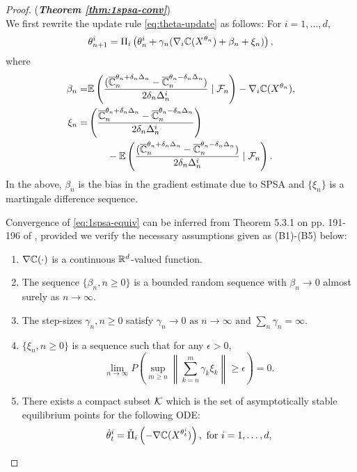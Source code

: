 \begin{proof}(\textbf{\textit{Theorem \ref{thm:1spsa-conv}}})\ \\
We first rewrite the update rule \eqref{eq:theta-update} as follows: For $i=1,\ldots,d$,
\begin{align}
\theta^{i}_{n+1}  =  \Pi_i\left(\theta^{i}_n +  \gamma_n(\nabla_{i} \mathbb{C}(X^{\theta_n}) + \beta_n + \xi_n)\right), 
\label{eq:1spsa-equiv}
\end{align}
where 
\begin{align*}
\beta_n = &\mathbb{E}\left(\dfrac{(\overline {\mathbb{C}}_n^{\theta_n + \delta_n \Delta_n} -\overline {\mathbb{C}}_n^{\theta_n - \delta_n \Delta_n})}{2 \delta_n \Delta_n^{i}} \mid \mathcal{F}_n \right) - \nabla_i \mathbb{C}(X^{\theta_n}),\\
\xi_n = & \left(\dfrac{\overline {\mathbb{C}}_n^{\theta_n + \delta_n \Delta_n} -\overline {\mathbb{C}}_n^{\theta_n - \delta_n \Delta_n}}{2 \delta_n\Delta_n^{i}}\right) \\
&\qquad - \mathbb{E}\left(\dfrac{(\overline {\mathbb{C}}_n^{\theta_n + \delta_n \Delta_n} -\overline {\mathbb{C}}_n^{\theta_n - \delta_n \Delta_n})}{2 \delta_n \Delta_n^{i}}\mid \mathcal{F}_n \right).
\end{align*}
In the above, $\beta_n$ is the bias in the gradient estimate due to SPSA and $\{\xi_n\}$ is a martingale difference sequence.

Convergence of \eqref{eq:1spsa-equiv} can be inferred from Theorem 5.3.1 on pp. 191-196 of \cite{kushner-clark}, provided we verify the necessary assumptions given as (B1)-(B5) below:
\begin{enumerate}[\bfseries (B1)]
\item $\nabla \mathbb{C}(\cdot)$ is a continuous $\mathbb{R}^{d}$-valued function.
\item  The sequence $\{\beta_n,n\geq 0\}$ is a bounded random sequence with
$\beta_n \rightarrow 0$ almost surely as $n\rightarrow \infty$.
\item The step-sizes $\gamma_n,n\geq 0$ satisfy
$  \gamma_n\rightarrow 0 \mbox{ as }n\rightarrow\infty \text{ and } \sum_n \gamma_n=\infty.$
\item $\{\xi_n, n\ge 0\}$ is a sequence such that for any $\epsilon>0$,
\[ \lim_{n\rightarrow\infty} P\left( \sup_{m\geq n}  \left\|
\sum_{k=n}^{m} \gamma_k \xi_k\right\| \geq \epsilon \right) = 0. \]
\item There exists a compact subset $\mathcal{K}$ which is the set of asymptotically stable equilibrium points for the following ODE:
\begin{align}
\dot\theta^{i}_t = \check\Pi_{i}\left(- \nabla \mathbb{C}(X^{\theta^{i}_t})\right), \text{ for } i=1,\dots,d,\label{eq:pi-ode}
\end{align}
\end{enumerate} 


\end{proof}
